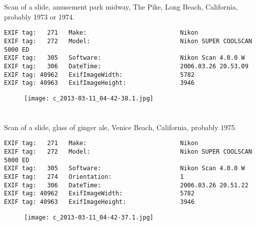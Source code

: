 \section{\protect{}}
\noindent Scan of a slide, amusement park midway, The Pike, Long Beach, California, probably 1973 or 1974.
\noindent
\begin{lstlisting}
EXIF tag:   271   Make:                          Nikon
EXIF tag:   272   Model:                         Nikon SUPER COOLSCAN 5000 ED
EXIF tag:   305   Software:                      Nikon Scan 4.0.0 W
EXIF tag:   306   DateTime:                      2006.03.26 20.53.09
EXIF tag: 40962   ExifImageWidth:                5782
EXIF tag: 40963   ExifImageHeight:               3946

\end{lstlisting}
\clearpage
\begin{figure}
\raggedleft
\texttt{[image: c\_2013-03-11\_04-42-38.1.jpg]}
\end{figure}


\clearpage
\section{\protect{}}
\noindent Scan of a slide, glass of ginger ale, Venice Beach, California, probably 1975.
\noindent
\begin{lstlisting}
EXIF tag:   271   Make:                          Nikon
EXIF tag:   272   Model:                         Nikon SUPER COOLSCAN 5000 ED
EXIF tag:   305   Software:                      Nikon Scan 4.0.0 W
EXIF tag:   274   Orientation:                   1
EXIF tag:   306   DateTime:                      2006.03.26 20.51.22
EXIF tag: 40962   ExifImageWidth:                5782
EXIF tag: 40963   ExifImageHeight:               3946

\end{lstlisting}
\clearpage
\begin{figure}
\raggedleft
\texttt{[image: c\_2013-03-11\_04-42-37.1.jpg]}
\end{figure}

